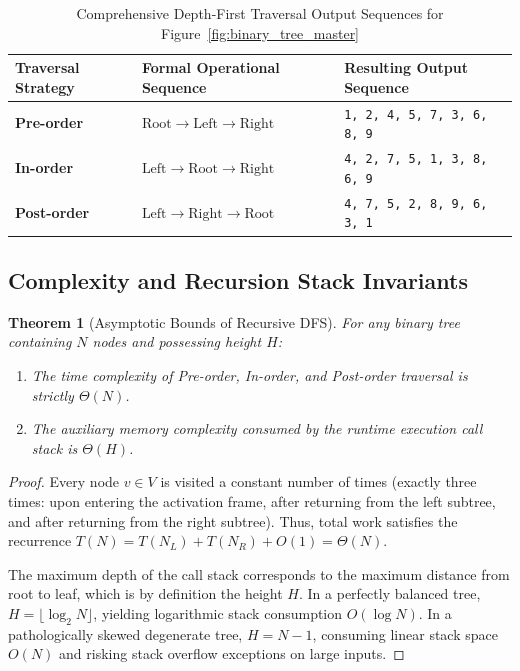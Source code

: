 \documentclass[10pt,journal,compsoc,onecolumn]{IEEEtran}
\newtheorem{theorem}{Theorem}
\begin{document}
\begin{table}[htbp]
\centering
\caption{Comprehensive Depth-First Traversal Output Sequences for Figure~\ref{fig:binary_tree_master}}
\label{tab:dfs_traversal_sequences}
\begin{tabular}{lp{6.8cm}l}
\toprule
\textbf{Traversal Strategy} & \textbf{Formal Operational Sequence} & \textbf{Resulting Output Sequence} \\
\midrule
\textbf{Pre-order} & $\text{Root} \to \text{Left} \to \text{Right}$ & \texttt{1, 2, 4, 5, 7, 3, 6, 8, 9} \\
\textbf{In-order} & $\text{Left} \to \text{Root} \to \text{Right}$ & \texttt{4, 2, 7, 5, 1, 3, 8, 6, 9} \\
\textbf{Post-order} & $\text{Left} \to \text{Right} \to \text{Root}$ & \texttt{4, 7, 5, 2, 8, 9, 6, 3, 1} \\
\bottomrule
\end{tabular}
\end{table}

\subsection{Complexity and Recursion Stack Invariants}
\begin{theorem}[Asymptotic Bounds of Recursive DFS]
For any binary tree containing $N$ nodes and possessing height $H$:
\begin{enumerate}
    \item The time complexity of Pre-order, In-order, and Post-order traversal is strictly $\Theta(N)$.
    \item The auxiliary memory complexity consumed by the runtime execution call stack is $\Theta(H)$.
\end{enumerate}
\end{theorem}
\begin{proof}
Every node $v \in V$ is visited a constant number of times (exactly three times: upon entering the activation frame, after returning from the left subtree, and after returning from the right subtree). Thus, total work satisfies the recurrence $T(N) = T(N_L) + T(N_R) + O(1) = \Theta(N)$.

The maximum depth of the call stack corresponds to the maximum distance from root to leaf, which is by definition the height $H$. In a perfectly balanced tree, $H = \lfloor \log_2 N \rfloor$, yielding logarithmic stack consumption $O(\log N)$. In a pathologically skewed degenerate tree, $H = N - 1$, consuming linear stack space $O(N)$ and risking stack overflow exceptions on large inputs.
\end{proof}
\end{document}
